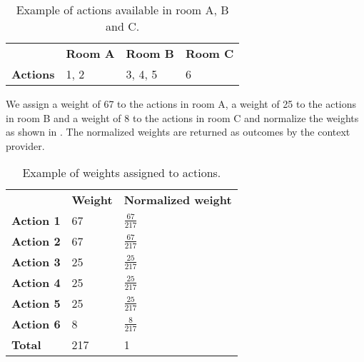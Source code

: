 \begin{table}[h!]
\centering
\caption{Example of actions available in room A, B and C.}
\label{tbl:sec:design:position-context-provider:actions}
\begin{tabular}{llll}
                 & \textbf{Room A} & \textbf{Room B} & \textbf{Room C} \\
\textbf{Actions} & 1, 2            & 3, 4, 5         & 6   
\end{tabular}
\end{table}

We assign a weight of 67 to the actions in room A, a weight of 25 to the actions in room B and a weight of 8 to the actions in room C and normalize the weights as shown in . The normalized weights are returned as outcomes by the context provider.

\begin{table}[]
\centering
\caption{Example of weights assigned to actions.}
\label{tbl:sec:design:position-context-provider:actions}
\begin{tabular}{lll}
                  & \textbf{Weight} & \textbf{Normalized weight} \\
\textbf{Action 1} & 67              & $\frac{67}{217}$                   \\
\textbf{Action 2} & 67              & $\frac{67}{217}$                   \\
\textbf{Action 3} & 25              & $\frac{25}{217}$                   \\
\textbf{Action 4} & 25              & $\frac{25}{217}$                   \\
\textbf{Action 5} & 25              & $\frac{25}{217}$                   \\
\textbf{Action 6} & 8               & $\frac{8}{217}$                    \\
\textbf{Total}    & 217             & 1                         
\end{tabular}
\end{table}

